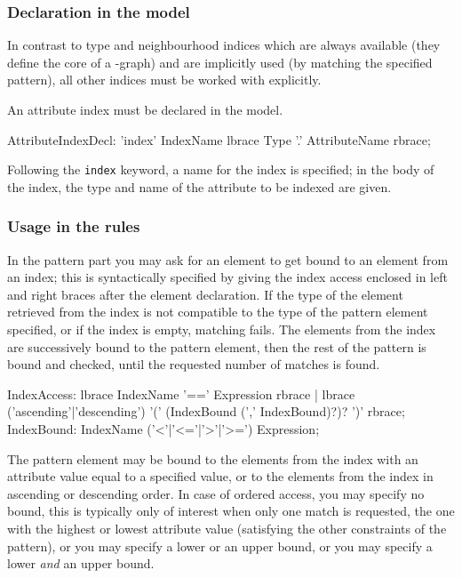 \subsubsection*{Declaration in the model}
In contrast to type and neighbourhood indices which are always available (they define the core of a \GrG{}-graph) and are implicitly used (by matching the specified pattern), all other indices must be worked with explicitly.

An attribute index must be declared in the model.

\begin{rail}
  AttributeIndexDecl: 'index' IndexName lbrace Type '.' AttributeName rbrace;
\end{rail}

Following the \texttt{index} keyword, a name for the index is specified; in the body of the index, the type and name of the attribute to be indexed are given.

\subsubsection*{Usage in the rules}\label{sub:indexusage}

In the pattern part you may ask for an element to get bound to an element from an index;
this is syntactically specified by giving the index access enclosed in left and right braces after the element declaration.
If the type of the element retrieved from the index is not compatible to the type of the pattern element specified,
or if the index is empty, matching fails.
The elements from the index are successively bound to the pattern element, then the rest of the pattern is bound and checked, until the requested number of matches is found.

\begin{rail}
  IndexAccess:
    lbrace IndexName '==' Expression rbrace |
		lbrace ('ascending'|'descending') '(' (IndexBound (',' IndexBound)?)? ')' rbrace;
	IndexBound: IndexName ('<'|'<='|'>'|'>=') Expression;
\end{rail}

The pattern element may be bound to the elements from the index with an attribute value equal to a specified value,
or to the elements from the index in ascending or descending order.
In case of ordered access, you may specify no bound, this is typically only of interest when only one match is requested, the one with the highest or lowest attribute value (satisfying the other constraints of the pattern), or you may specify a lower or an upper bound, or you may specify a lower \emph{and} an upper bound.

